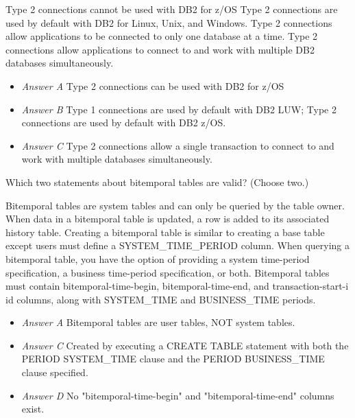 \documentclass[answers, 11pt]{exam}
\begin{document}
\begin{questions}
\begin{choices}
	\choice Type 2 connections cannot be used with DB2 for z/OS
	\choice Type 2 connections are used by default with DB2 for Linux, Unix, and Windows.
	\choice Type 2 connections allow applications to be connected to only one database at a time.
	\CorrectChoice Type 2 connections allow applications to connect to and work with multiple DB2 databases 
	simultaneously.
\end{choices}

\begin{solution}
	\begin{itemize}
		\item \textit{Answer A} Type 2 connections can be used with DB2 for z/OS
		\item \textit{Answer B} Type 1 connections are used by default with DB2 LUW; Type 2 connections are used by default with DB2 z/OS.
		\item \textit{Answer C} Type 2 connections allow a single transaction to connect to and work with multiple databases simultaneously.
	\end{itemize}
\end{solution}

\question[1]
Which two statements about bitemporal tables are valid? (Choose two.)
\begin{choices}
	\choice Bitemporal tables are system tables and can only be queried by the table owner.
	\CorrectChoice When data in a bitemporal table is updated, a row is added to its associated history table.
	\choice Creating a bitemporal table is similar to creating a base table except users must define a 
	SYSTEM\_TIME\_PERIOD column.
	\CorrectChoice When querying a bitemporal table, you have the option of providing a system time-period 
	specification, a business time-period specification, or both.
	\choice Bitemporal tables must contain bitemporal-time-begin, bitemporal-time-end, and transaction-start-i
	id columns, along with SYSTEM\_TIME and BUSINESS\_TIME periods.
\end{choices}

\begin{solution}
	\begin{itemize}
		\item \textit{Answer A} Bitemporal tables are user tables, NOT system tables.
		\item \textit{Answer C} Created by executing a CREATE TABLE statement with both the PERIOD SYSTEM\_TIME clause and the PERIOD BUSINESS\_TIME clause specified.
		\item \textit{Answer D} No "bitemporal-time-begin" and "bitemporal-time-end" columns exist.
	\end{itemize}
\end{solution}


\end{questions}
\end{document}

